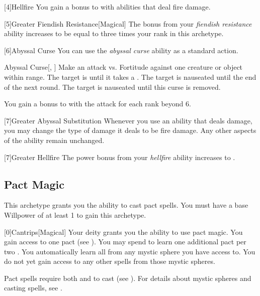         [4]{Hellfire} You gain a  bonus to  with abilities that deal fire damage.

        [5]{Greater Fiendish Resistance}[Magical] The bonus from your \textit{fiendish resistance} ability increases to be equal to three times your rank in this archetype.

        [6]{Abyssal Curse} You can use the \textit{abyssal curse} ability as a standard action.
        \begin{freeability}{Abyssal Curse}[, ]
            Make an attack vs. Fortitude against one creature or object within \rngmed range.
            \hit The target is  until it takes a .
            \glance The target is nauseated until the end of the next round.
            \crit The target is nauseated until this curse is removed.

            \rankline
            You gain a  bonus to  with the attack for each rank beyond 6.
        \end{freeability}

        [7]{Greater Abyssal Substitution} Whenever you use an ability that deals damage, you may change the type of damage it deals to be fire damage.
        Any other aspects of the ability remain unchanged.

        [7]{Greater Hellfire} The power bonus from your \textit{hellfire} ability increases to .

    \newpage
    \subsection{Pact Magic}
        This archetype grants you the ability to cast pact spells.
        You must have a base Willpower of at least 1 to gain this archetype.

        [0]{Cantrips}[Magical]
        Your deity grants you the ability to use pact magic.
        You gain access to one pact  (see ).
        You may spend  to learn one additional pact  per two .
        You automatically learn all  from any mystic sphere you have access to.
        You do not yet gain access to any other spells from those mystic spheres.

        Pact spells require both  and  to cast (see ).
        For details about mystic spheres and casting spells, see .

